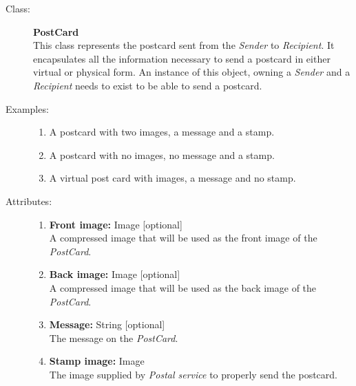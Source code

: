 \documentclass[10pt,a4paper]{article}
\begin{document}
\begin{description}
\item[Class:] \textbf{PostCard} \hfill \\
This class represents the postcard sent from the \textit{Sender} to \textit{Recipient}. It encapsulates all the information necessary to send a postcard in either virtual or physical form. An instance of this object, owning a \textit{Sender} and a \textit{Recipient} needs to exist to be able to send a postcard. 

\item[Examples:] \hfill
\begin{enumerate}
\item A postcard with two images, a message and a stamp.
\item A postcard with no images, no message and a stamp.
\item A virtual post card with images, a message and no stamp.
\end{enumerate}

\item[Attributes:] \hfill
\begin{enumerate}
\item \textbf{Front image:} Image [optional] \hfill \\A compressed image that will be used as the front image of the \textit{PostCard}. 
\item \textbf{Back image:} Image [optional] \hfill \\A compressed image that will be used as the back image of the \textit{PostCard}.
\item \textbf{Message:} String [optional] \hfill \\The message on the \textit{PostCard}.
\item \textbf{Stamp image:} Image \hfill \\The image supplied by \textit{Postal service} to properly send the postcard.
\end{enumerate}
\end{description}

\hrulefill
\end{document}
